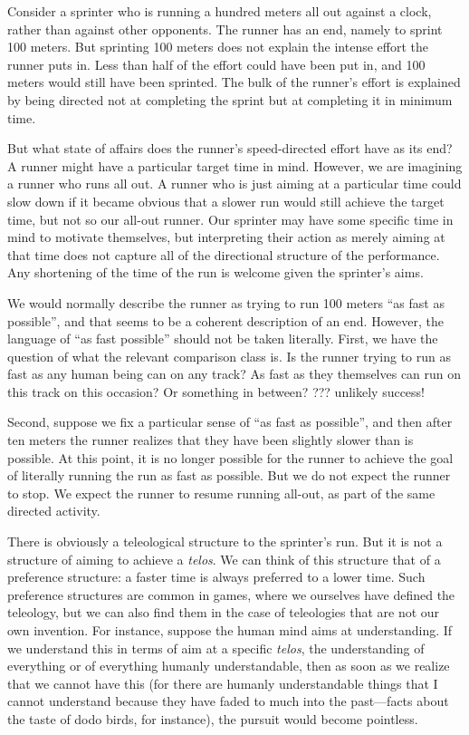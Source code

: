 Consider a sprinter who is running a hundred meters all out against a clock, rather than against other opponents. The runner has an end, 
namely to sprint 100 meters. But sprinting 100 meters does not explain the intense effort the runner puts in. Less than half of the effort 
could have been put in, and 100 meters would still have been sprinted. The bulk of the runner's effort is explained by being directed 
not at completing the sprint but at completing it in minimum time.

But what state of affairs does the runner's speed-directed effort have as its end? A runner might have a particular target time in mind.
However, we are imagining a runner who runs all out. A runner who is just aiming at a particular time could slow down if it became obvious
that a slower run would still achieve the target time, but not so our all-out runner. Our sprinter may have some specific time in mind
to motivate themselves, but interpreting their action as merely aiming at that time does not capture all of the directional structure 
of the performance. Any shortening of the time of the run is welcome given the sprinter's aims. 

We would normally describe the runner as trying to run 100 meters ``as fast as possible'', and that seems to be a coherent description
of an end. However, the language of ``as fast possible'' should not be taken literally. First, we have the question of what the relevant
comparison class is. Is the runner trying to run as fast as any human being can on any track? As fast as they themselves can run on this
track on this occasion? Or something in between? ??? unlikely success!

Second, suppose we fix a particular sense of ``as fast as possible'', and then after ten meters the runner realizes that they have
been slightly slower than is possible. At this point, it is no longer possible for the runner to achieve the goal of literally running
the run as fast as possible. But we do not expect the runner to stop. We expect the runner to resume running all-out, as part of the
same directed activity.

There is obviously a teleological structure to the sprinter's run. But it is not a structure of aiming to achieve a \textit{telos}. 
We can think of this structure that of a preference structure: a faster time is always preferred to a lower time. 
Such preference structures are common in games, where we ourselves have defined the teleology, but we can also find them in the 
case of teleologies that are not our own invention. For instance, suppose the human mind aims at understanding. If we understand
this in terms of aim at a specific \textit{telos}, the understanding of everything or of everything humanly understandable, then as soon as 
we realize that we cannot have this (for there are humanly understandable things that I cannot understand because they have faded to much
into the past---facts about the taste of dodo birds, for instance), the pursuit would become pointless. 

